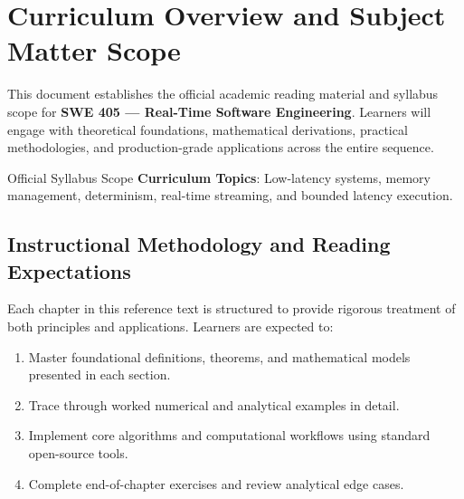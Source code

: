 \section{Curriculum Overview and Subject Matter Scope}

This document establishes the official academic reading material and syllabus scope for \textbf{SWE 405 --- Real-Time Software Engineering}. Learners will engage with theoretical foundations, mathematical derivations, practical methodologies, and production-grade applications across the entire sequence.

\begin{InsightBox}{Official Syllabus Scope}
  \textbf{Curriculum Topics}: Low-latency systems, memory management, determinism, real-time streaming, and bounded latency execution.
\end{InsightBox}

\subsection{Instructional Methodology and Reading Expectations}

Each chapter in this reference text is structured to provide rigorous treatment of both principles and applications. Learners are expected to:
\begin{enumerate}
  \item Master foundational definitions, theorems, and mathematical models presented in each section.
  \item Trace through worked numerical and analytical examples in detail.
  \item Implement core algorithms and computational workflows using standard open-source tools.
  \item Complete end-of-chapter exercises and review analytical edge cases.
\end{enumerate}

